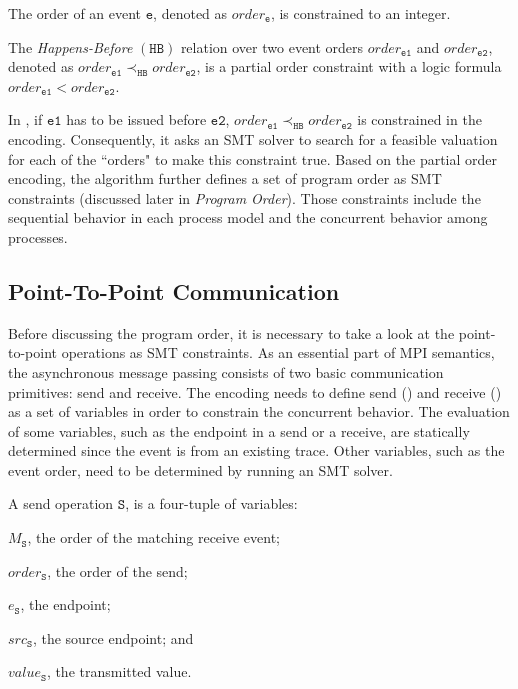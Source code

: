 \begin{definition}[Order]\label{def:order}
The order of an event $\mathtt{e}$, denoted as $\mathit{order}_\mathtt{e}$, is constrained to an integer.
\end{definition}

\begin{definition}\label{def:happens-before}
The \emph{Happens-Before} $(\mathtt{HB})$ relation over two event orders $\mathit{order}_\mathtt{e1}$ and $\mathit{order}_\mathtt{e2}$, denoted as
$\mathit{order}_\mathtt{e1} \mathrm{\prec_\mathtt{HB}} \mathit{order}_\mathtt{e2}$, is a partial order constraint with a logic formula $\mathit{order}_\mathtt{e1} <  \mathit{order}_\mathtt{e2}$. 
\label{def:hb}
\end{definition}

In , if $\mathtt{e1}$ has to be issued before $\mathtt{e2}$, $\mathit{order}_\mathtt{e1} \mathrm{\prec_\mathtt{HB}} \mathit{order}_\mathtt{e2}$ is constrained in the encoding. Consequently, it asks an SMT solver to search for a feasible valuation for each of the ``orders" to make this constraint true. Based on the partial order encoding, the algorithm further defines a set of program order as SMT constraints (discussed later in \emph{Program Order}). Those constraints include the sequential behavior in each process model and the concurrent behavior among processes. 

\subsection{Point-To-Point Communication}
Before discussing the program order, it is necessary to take a look at the point-to-point operations as SMT constraints. As an essential part of MPI semantics, the asynchronous message passing consists of two basic communication primitives: send and receive. The encoding needs to define send () and receive () as a set of variables in order to constrain the concurrent behavior. The evaluation of some variables, such as the endpoint in a send or a receive, are statically determined since the event is from an existing trace. Other variables, such as the event order, need to be determined by running an SMT solver. 
 
\begin{definition}[Send] \label{def:snd}
A send operation $\mathtt{S}$, is a four-tuple of variables:
\begin{compactenum}
\item $M_\mathtt{S}$, the order of the matching receive event;
\item $\mathit{order}_\mathtt{S}$, the order of the send;
\item $e_\mathtt{S}$, the endpoint; 
\item $src_\mathtt{S}$, the source endpoint; and
\item $\mathit{value}_\mathtt{S}$, the transmitted value.
\end{compactenum}
\end{definition}

